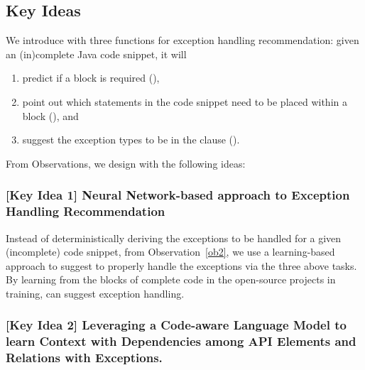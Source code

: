 \subsection{Key Ideas}
\label{key:sec}

We introduce {\tool} with three functions for exception handling
recommendation: given an (in)complete Java code snippet, it will

\vspace{-3pt}
\begin{enumerate}

\item predict if a  block is required ({\xblock}),

\item point out which statements in the code snippet need to be placed within
a  block ({\xstate}), and

\item suggest the exception types to be in the 
clause ({\xtype}).

\end{enumerate}

From Observations, we design {\tool} with the following
ideas:

\subsubsection{[Key Idea 1] Neural Network-based approach to Exception Handling Recommendation}
Instead of deterministically deriving the exceptions to be handled for
a given (incomplete) code snippet, from Observation~\ref{ob2}, we
use a learning-based approach to suggest to properly handle the
exceptions via the three above tasks.
By learning from the  blocks of complete code in
the open-source projects in training, {\tool} can
suggest exception handling.




\subsubsection{[Key Idea 2] Leveraging a Code-aware Language Model to learn Context with Dependencies among API Elements and Relations with Exceptions.}
  
